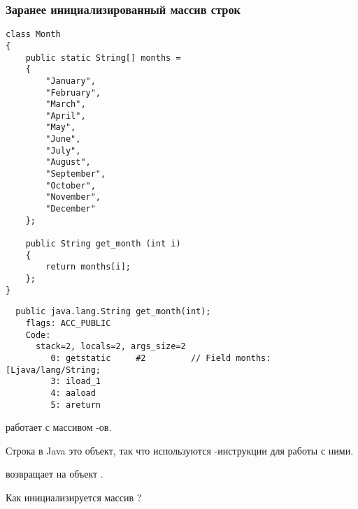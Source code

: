 \subsubsection{Заранее инициализированный массив строк}
\label{Java_2D_array_month}

\begin{lstlisting}[style=customjava]
class Month
{
	public static String[] months = 
	{
		"January", 
		"February", 
		"March", 
		"April",
		"May",
		"June",
		"July",
		"August",
		"September",
		"October",
		"November",
		"December"
	};

	public String get_month (int i)
	{
		return months[i];
	};
} 
\end{lstlisting}




\begin{lstlisting}
  public java.lang.String get_month(int);
    flags: ACC_PUBLIC
    Code:
      stack=2, locals=2, args_size=2
         0: getstatic     #2         // Field months:[Ljava/lang/String;
         3: iload_1       
         4: aaload        
         5: areturn       
\end{lstlisting}


 работает с массивом -ов.

Строка в Java это объект, так что используются -инструкции для работы с ними.

 возвращает  на объект .


Как инициализируется массив ?

